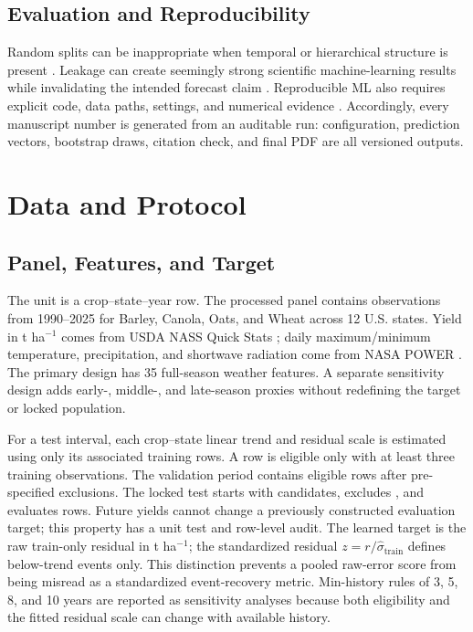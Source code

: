 \documentclass[conference]{IEEEtran}
\begin{document}
\subsection{Evaluation and Reproducibility}
Random splits can be inappropriate when temporal or hierarchical structure is
present \cite{Roberts2017}. Leakage can create seemingly strong scientific
machine-learning results while invalidating the intended forecast claim
\cite{KapoorNarayanan2023}. Reproducible ML also requires explicit code, data
paths, settings, and numerical evidence \cite{Pineau2021}. Accordingly, every
manuscript number is generated from an auditable run: configuration, prediction
vectors, bootstrap draws, citation check, and final PDF are all versioned outputs.

\section{Data and Protocol}
\subsection{Panel, Features, and Target}
The unit is a crop--state--year row. The processed panel contains \AuditTotalRows{}
observations from 1990--2025 for Barley, Canola, Oats, and Wheat across 12 U.S.
states. Yield in t ha$^{-1}$ comes from USDA NASS Quick Stats
\cite{USDANASSQuickStats}; daily maximum/minimum temperature, precipitation, and
shortwave radiation come from NASA POWER \cite{NASAPOWER2026}. The primary design
has 35 full-season weather features. A separate sensitivity design adds early-,
middle-, and late-season proxies without redefining the target or locked population.

\begin{table}[t]
\centering
\caption{Data-flow and final-test eligibility reconstructed from the raw inputs.}
\label{tab:dataflow}
\scriptsize
\resizebox{\columnwidth}{!}{}
\end{table}

For a test interval, each crop--state linear trend and residual scale is estimated
using only its associated training rows. A row is eligible only with at least three
training observations. The validation period contains \AuditValidationRows{} eligible
rows after \AuditValidationExcluded{} pre-specified exclusions. The locked test
starts with \AuditTestCandidateRows{} candidates, excludes \AuditTestExcluded{},
and evaluates \AuditTestRows{} rows. Future yields cannot change a previously
constructed evaluation target; this property has a unit test and row-level audit.
The learned target is the raw train-only residual in t ha$^{-1}$; the standardized
residual $z=r/\hat{\sigma}_{\mathrm{train}}$ defines below-trend events only.
This distinction prevents a pooled raw-error score from being misread as a
standardized event-recovery metric. Min-history rules of 3, 5, 8, and 10 years are
reported as sensitivity analyses because both eligibility and the fitted residual
scale can change with available history.
\end{document}
